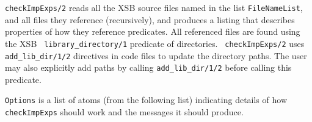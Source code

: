 \begin{description}
%
{\tt checkImpExps/2} reads all the XSB source files named in the list
{\tt FileNameList}, and all files they reference (recursively), and
produces a listing that describes properties of how they reference
predicates.  All referenced files are found using the XSB {\tt
  library\_directory/1} predicate of directories.  {\tt
  checkImpExps/2} uses {\tt add\_lib\_dir/1/2} directives in code
files to update the directory paths.  The user may also explicitly add
paths by calling {\tt add\_lib\_dir/1/2} before calling this
predicate.

{\tt Options} is a list of atoms (from the following list) indicating
details of how {\tt checkImpExps} should work and the messages it
should produce.


\end{description}
